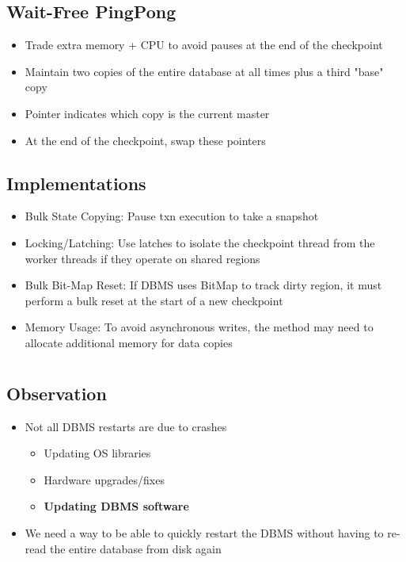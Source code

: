 \documentclass[11pt]{article}
\begin{document}
    \subsection*{Wait-Free PingPong}
    \begin{itemize}
        \item Trade extra memory + CPU to avoid pauses at the end of the checkpoint
        \item Maintain two copies of the entire database at all times plus a third "base" copy
        \item Pointer indicates which copy is the current master
        \item At the end of the checkpoint, swap these pointers
    \end{itemize}

    \subsection*{Implementations}
    \begin{itemize}
        \item Bulk State Copying: Pause txn execution to take a snapshot
        \item Locking/Latching: Use latches to isolate the checkpoint thread from the worker threads if they operate on shared regions
        \item Bulk Bit-Map Reset: If DBMS uses BitMap to track dirty region, it must perform a bulk reset at the start of a new checkpoint
        \item Memory Usage: To avoid asynchronous writes, the method may need to allocate additional memory for data copies
    \end{itemize}


\section{}

    \subsection*{Observation}
    \begin{itemize}
        \item Not all DBMS restarts are due to crashes
        \begin{itemize}
            \item Updating OS libraries
            \item Hardware upgrades/fixes
            \item \textbf{Updating DBMS software}
        \end{itemize}
        \item We need a way to be able to quickly restart the DBMS without having to re-read the entire database from disk again
    \end{itemize}
\end{document}
